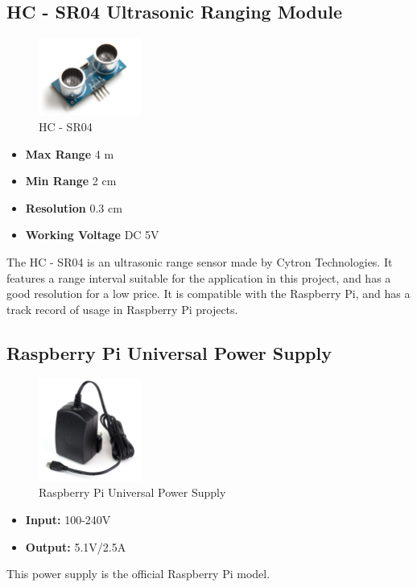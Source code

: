 \subsection{HC - SR04 Ultrasonic Ranging Module}
\begin{figure}[H]
  \centering
  \includegraphics[width=0.3\textwidth]{fig/hc}
  \caption{HC - SR04}
  \label{fig:hc}
\end{figure}
\begin{itemize}
\itemsep0em
\item \textbf{Max Range} 4 m
\item \textbf{Min Range} 2 cm
\item \textbf{Resolution} 0.3 cm
\item \textbf{Working Voltage} DC 5V
\end{itemize}

The HC - SR04 is an ultrasonic range sensor made by Cytron Technologies. It features a range interval suitable for the application in this project, and has a good resolution for a low price. It is compatible with the Raspberry Pi, and has a track record of usage in Raspberry Pi projects.

\subsection{Raspberry Pi Universal Power Supply}
\begin{figure}[H]
  \centering
  \includegraphics[width=0.3\textwidth]{fig/rpipower}
  \caption{Raspberry Pi Universal Power Supply}
  \label{fig:power}
\end{figure}
\begin{itemize}
\itemsep0em 
\item \textbf{Input:} 100-240V
\item \textbf{Output:} 5.1V/2.5A
\end{itemize}
This power supply is the official Raspberry Pi model.








